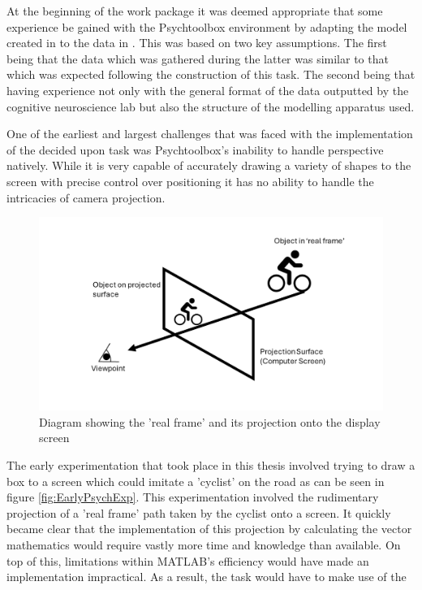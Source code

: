 At the beginning of the work package it was deemed appropriate that some experience be gained with the Psychtoolbox environment by adapting the model created in \citet{geuzebroekBalancingTrueFalse2023} to the data in \citet{kellyInternalExternalInfluences2013}. This was based on two key assumptions. The first being that the data which was gathered during the latter was similar to that which was expected following the construction of this task. The second being that having experience not only with the general format of the data outputted by the cognitive neuroscience lab but also the structure of the modelling apparatus used.


One of the earliest and largest challenges that was faced with the implementation of the decided upon task was Psychtoolbox's inability to handle perspective natively. While it is very capable of accurately drawing a variety of shapes to the screen with precise control over positioning it has no ability to handle the intricacies of camera projection.

\begin{figure}[hbt!]
    \centering
    \includegraphics[width=0.75\linewidth]{figures/Projection Diagram.png}
    \caption{Diagram showing the 'real frame' and its projection onto the display screen}
    \label{fig:}
\end{figure}

The early experimentation that took place in this thesis involved trying to draw a box to a screen which could imitate a 'cyclist' on the road as can be seen in figure \ref{fig:EarlyPsychExp}. This experimentation involved the rudimentary projection of a 'real frame' path taken by the cyclist onto a screen. It quickly became clear that the implementation of this projection by calculating the vector mathematics would require vastly more time and knowledge than available. On top of this, limitations within MATLAB's efficiency would have made an implementation impractical. As a result, the task would have to make use of the 

